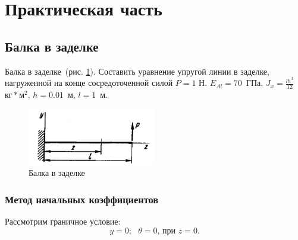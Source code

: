 \documentclass[12pt, a4paper]{article}
\begin{document}
\section{Практическая часть}
\subsection{Балка в заделке}
Балка в заделке~(рис. \ref{pic7}). Составить уравнение упругой линии в заделке, нагруженной на конце сосредоточенной силой $P = 1$ Н. 
$E_{Al} = 70$~ГПа, $ J_{x} = \frac{l h^3}{12}$~$\mbox{кг}*\mbox{м}^2$, $h = 0.01$~м, $l = 1$~м.

\begin{figure}[!h]
	\centering
	\includegraphics[width=0.5\textwidth]{pic.7}%
	\caption{Балка в заделке}
	\vspace*{-2mm}
	\label{pic7}
\end{figure}

\subsubsection{Метод начальных коэффициентов}
Рассмотрим граничное условие:
\begin{equation}
	\label{graneq11}
	y = 0;\mbox{ } \theta = 0\mbox{, при } z = 0.
\end{equation}
\end{document}
